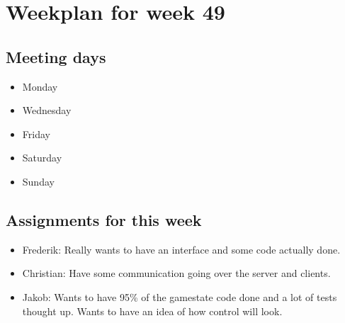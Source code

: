 \section{Weekplan for week 49}
\subsection{Meeting days}
\begin{itemize}
\item Monday
\item Wednesday
\item Friday
\item Saturday
\item Sunday
\end{itemize}

\subsection{Assignments for this week}
\begin{itemize}
\item Frederik: Really wants to have an interface and some code actually done.

\item Christian: Have some communication going over the server and clients.

\item Jakob: Wants to have 95\% of the gamestate code done and a lot of tests thought up. Wants to have an idea of how control will look.
\end{itemize}